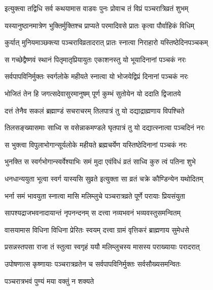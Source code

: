 \twolineshloka
{इत्युक्त्वा तद्विधि सर्व कथयामास वाडवः}
{पुनः प्रोवाच तं विप्रं पञ्चरात्रिव्रतं शुभम्} %

\twolineshloka
{यस्यानुष्ठानमात्रेण भुक्तिर्मुक्तिश्च प्राप्यते}
{परमादिवसे प्रातः कृत्वा पौर्वाहिकं विधिम्} %

\twolineshloka
{कुर्यात् मुनियमाञ्छक्त्या पञ्चराविव्रतादरात्}
{प्रातः स्नात्वा निराहारो यस्तिष्ठेदिनपञ्चकम्} %

\twolineshloka
{स गच्छेद्वैष्णवं स्थानं पितृमातृप्रियायुतः}
{एकाशनस्तु यो भूयादिनानां पञ्चकं नरः} %

\twolineshloka
{सर्वपापविनिर्मुक्तः स्वर्गलोके महीयते}
{स्नात्वा यो भोजयेद्विप्रं दिनानां पञ्चकं नरः} %

\twolineshloka
{भोजितं तेन हि जगत्सदेवासुरमानुषम्}
{पूर्ण कुम्भं सुतोयेन यो ददाति द्विजातये} %

\twolineshloka
{दत्तं तेनैव सकलं ब्रह्माण्डं सचराचरम्}
{तिलपात्रं तु यो दद्याद्राह्मणाय विपश्चिते} %

\twolineshloka
{तिलसङ्ख्यासमाः साध्वि स वसेन्नाकमण्डले}
{घृतपात्रं तु यो दद्यात्स्नात्वा पञ्चदिनं नरः} %

\twolineshloka
{स भुक्त्वा विपुलाभोगान्सूर्यलोके महीयते}
{ब्रह्मचर्येण यस्तिष्ठेदिनानां पञ्चकं नरः} %

\twolineshloka
{भुनक्ति स स्वर्गभोगान्स्वर्वेश्याभिः समं मुदा}
{एवंविधं व्रतं साध्वि कुरु त्वं पतिना शुभे} %

\twolineshloka
{धनधान्ययुता भूत्वा स्वर्ग यास्यसि सुव्रते}
{इत्युक्ता सा व्रतं चक्रे कौण्डिन्येन यथोदितम्} %

\twolineshloka
{भर्ना समं भावयुता स्नात्वा मासि मलिम्लुचे}
{पञ्चरात्रव्रते पूर्णे परायाः प्रियसंयुता} %

\twolineshloka
{सापश्यद्राजभवनादायान्तं नृपनन्दनम्}
{स दत्त्वा नव्यभवनं भव्यवस्तुसमन्वितम्} %

\twolineshloka
{वासयामास विधिना विधिना प्रेरितः स्वयम्}
{दत्त्वा ग्रामं वृत्तिकरं ब्राह्मणाय सुमेधसे} %

\twolineshloka
{प्रसन्नस्तपसा राजा तं स्तुत्वा स्वगृहं ययौ}
{मलिम्लुचस्य मासस्य पराख्यायाः परादरात्} %

\twolineshloka
{उपोषणात्स कृष्णायाः पञ्चरात्रव्रतेन च}
{सर्वपापविनिर्मुक्तः सर्वसौख्यसमन्वितः} %



\onelineshloka
{पञ्चरात्रभवं पुण्यं मया वक्तुं न शक्यते} %

